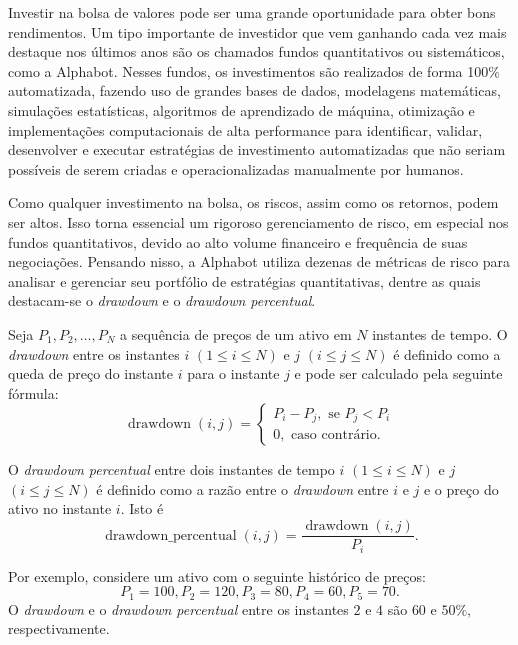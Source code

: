 Investir na bolsa de valores pode ser uma grande oportunidade para obter bons rendimentos. Um tipo importante de investidor que vem ganhando
cada vez mais destaque nos últimos anos são os chamados fundos quantitativos ou sistemáticos, como a Alphabot. Nesses fundos,  os investimentos
são realizados de forma 100\% automatizada, fazendo uso de grandes bases de dados, modelagens matemáticas, simulações estatísticas,
algoritmos de aprendizado de máquina, otimização e implementações computacionais de alta performance para identificar, validar, desenvolver
e executar estratégias de investimento automatizadas que não seriam possíveis de serem criadas e operacionalizadas manualmente por humanos.

Como qualquer investimento na bolsa, os riscos, assim como os retornos, podem ser altos. Isso torna essencial um rigoroso gerenciamento de risco,
em especial nos fundos quantitativos, devido ao alto volume financeiro e frequência de suas negociações. Pensando nisso, a Alphabot utiliza dezenas
de métricas de risco para analisar e gerenciar seu portfólio de estratégias quantitativas, dentre as quais destacam-se o \emph{drawdown} e o
\emph{drawdown percentual}.

Seja $P_1, P_2, \ldots, P_N$ a sequência de preços de um ativo em $N$ instantes de tempo.
O \emph{drawdown} entre os instantes $i$ $(1 \leq i \leq N)$ e $j$ $(i \leq j \leq N)$ é definido como a queda de preço do instante $i$ para o instante
$j$ e pode ser calculado pela seguinte fórmula:
\begin{equation*}
    \operatorname{drawdown}\left(i, j\right) = \begin{cases}
        P_i - P_j, \text{ se } P_j < P_i \\
        0, \text{ caso contrário.}
    \end{cases}
\end{equation*}

O \emph{drawdown percentual} entre dois instantes de tempo $i$ $(1 \leq i \leq N)$ e $j$ $(i \leq j \leq N)$ é definido como a razão entre o
\emph{drawdown} entre $i$ e $j$ e o preço do ativo no instante $i$. Isto é
\begin{equation*}
    \operatorname{drawdown\_percentual}\left(i, j\right) = \frac{\operatorname{drawdown}\left(i, j\right)}{P_i}. 
\end{equation*}

Por exemplo, considere um ativo com o seguinte histórico de preços:
\begin{equation*}
P_1 = 100, P_2 = 120, P_3 = 80, P_4 =  60, P_5 = 70.
\end{equation*}
O \emph{drawdown} e o \emph{drawdown percentual} entre os instantes $2$ e $4$ são $60$ e $50\%$, respectivamente.

